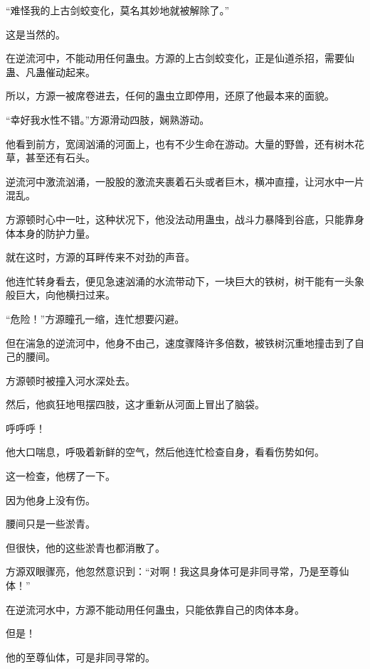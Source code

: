 \begin{this_body}
“难怪我的上古剑蛟变化，莫名其妙地就被解除了。”

这是当然的。

在逆流河中，不能动用任何蛊虫。方源的上古剑蛟变化，正是仙道杀招，需要仙蛊、凡蛊催动起来。

所以，方源一被席卷进去，任何的蛊虫立即停用，还原了他最本来的面貌。

“幸好我水性不错。”方源滑动四肢，娴熟游动。

他看到前方，宽阔汹涌的河面上，也有不少生命在游动。大量的野兽，还有树木花草，甚至还有石头。

逆流河中激流汹涌，一股股的激流夹裹着石头或者巨木，横冲直撞，让河水中一片混乱。

方源顿时心中一吐，这种状况下，他没法动用蛊虫，战斗力暴降到谷底，只能靠身体本身的防护力量。

就在这时，方源的耳畔传来不对劲的声音。

他连忙转身看去，便见急速汹涌的水流带动下，一块巨大的铁树，树干能有一头象般巨大，向他横扫过来。

“危险！”方源瞳孔一缩，连忙想要闪避。

但在湍急的逆流河中，他身不由己，速度骤降许多倍数，被铁树沉重地撞击到了自己的腰间。

方源顿时被撞入河水深处去。

然后，他疯狂地甩摆四肢，这才重新从河面上冒出了脑袋。

呼呼呼！

他大口喘息，呼吸着新鲜的空气，然后他连忙检查自身，看看伤势如何。

这一检查，他楞了一下。

因为他身上没有伤。

腰间只是一些淤青。

但很快，他的这些淤青也都消散了。

方源双眼骤亮，他忽然意识到：“对啊！我这具身体可是非同寻常，乃是至尊仙体！”

在逆流河水中，方源不能动用任何蛊虫，只能依靠自己的肉体本身。

但是！

他的至尊仙体，可是非同寻常的。

\end{this_body}

